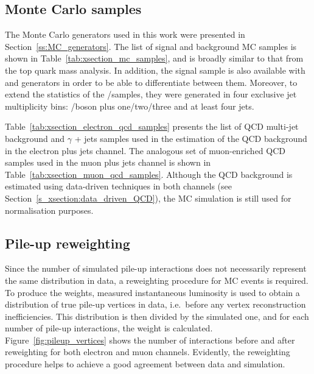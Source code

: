 \subsection{Monte Carlo samples}
\label{ss_xsection:MC_samples}
The Monte Carlo generators used in this work were presented in Section~\ref{ss:MC_generators}. The list of signal and
background MC samples is shown in Table~\ref{tab:xsection_mc_samples}, and is broadly similar to that from the top quark
mass analysis. In addition, the signal \ttjets sample is also available with \POWHEG and \MCATNLO generators in order to
be able to differentiate between them. Moreover, to extend the statistics of the \W/\ZpJets samples, they were generated
in four exclusive jet multiplicity bins: \W/\Z boson plus one/two/three and at least four jets.

Table~\ref{tab:xsection_electron_qcd_samples} presents the list of QCD multi-jet background and $\gamma$ + jets samples
used in the estimation of the QCD background in the electron plus jets channel. The analogous set of muon-enriched QCD
samples used in the muon plus jets channel is shown in Table~\ref{tab:xsection_muon_qcd_samples}. Although the QCD
background is estimated using data-driven techniques in both channels (see Section~\ref{s_xsection:data_driven_QCD}),
the MC simulation is still used for normalisation purposes.



\subsection{Pile-up reweighting}
\label{sss_xsection:pileup_reweighting}
Since the number of simulated pile-up interactions does not necessarily represent the same distribution in data, a
reweighting procedure for MC events is required. To produce the weights, measured instantaneous luminosity is used to
obtain a distribution of true pile-up vertices in data, i.e.\ before any vertex reconstruction inefficiencies. This
distribution is then divided by the simulated one, and for each number of pile-up interactions, the weight is
calculated. Figure~\ref{fig:pileup_vertices} shows the number of interactions before and after reweighting for both
electron and muon channels. Evidently, the reweighting procedure helps to achieve a good agreement between data and
simulation.

